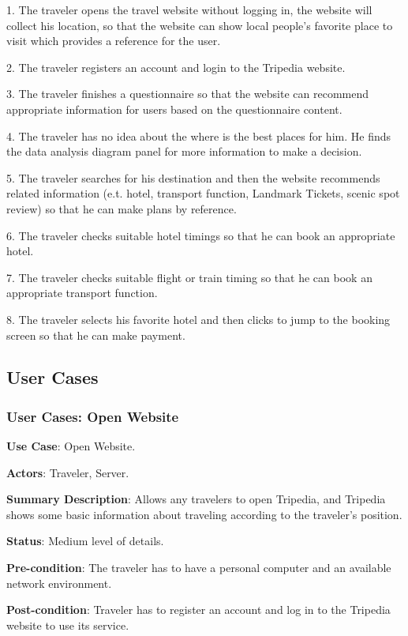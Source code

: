 \documentclass[conference]{IEEEtran}
\begin{document}
1. The traveler opens the travel website without logging in, the website will collect his location, so that the website can show local people's favorite place to visit which provides a reference for the user.

2. The traveler registers an account and login to the Tripedia website.

3. The traveler finishes a questionnaire so that the website can recommend appropriate information for users based on the questionnaire content.

4. The traveler has no idea about the where is the best places for him. He finds the data analysis diagram panel for more information to make a decision.

5. The traveler searches for his destination and then the website recommends related information (e.t. hotel, transport function, Landmark Tickets, scenic spot review) so that he can make plans by reference.

6. The traveler checks suitable hotel timings so that he can book an appropriate hotel.

7. The traveler checks suitable flight or train timing so that he can book an appropriate transport function.

8. The traveler selects his favorite hotel and then clicks to jump to the booking screen so that he can make payment.



\subsection{User Cases}


\subsubsection{User Cases: Open Website}

\textbf{ }

\textbf{Use Case}: Open Website.

\textbf{Actors}: Traveler, Server.

\textbf{Summary Description}: Allows any travelers to open Tripedia, and Tripedia shows some basic information about traveling according to the traveler's position.
 
\textbf{Status}: Medium level of details.

\textbf{Pre-condition}: The traveler has to have a personal computer and an available network environment.

\textbf{Post-condition}: Traveler has to register an account and log in to the Tripedia website to use its service.
\end{document}

